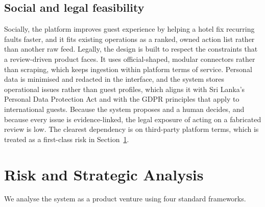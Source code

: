 \documentclass[11pt,a4paper]{article}
\begin{document}
\subsection{Social and legal feasibility}
\label{sec:legal}
Socially, the platform improves guest experience by helping a hotel fix recurring faults faster, and it
fits existing operations as a ranked, owned action list rather than another raw feed. Legally, the design
is built to respect the constraints that a review-driven product faces. It uses official-shaped,
modular connectors rather than scraping, which keeps ingestion within platform terms of service.
Personal data is minimised and redacted in the interface, and the system stores operational issues
rather than guest profiles, which aligns it with Sri Lanka's Personal Data Protection Act and with the
GDPR principles that apply to international guests. Because the system proposes and a human decides, and
because every issue is evidence-linked, the legal exposure of acting on a fabricated review is low. The
clearest dependency is on third-party platform terms, which is treated as a first-class risk in
Section~\ref{sec:risk}.

\section{Risk and Strategic Analysis}
\label{sec:risk}

We analyse the system as a product venture using four standard frameworks.
\end{document}
